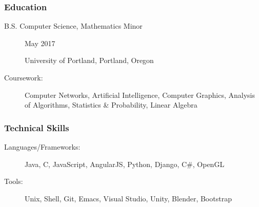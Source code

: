 \documentclass{article}
\begin{document}
\subsubsection*{Education}
    \begin{description}
        \item[B.S. Computer Science, Mathematics Minor]\hfill May 2017

        University of Portland, Portland, Oregon

        \vspace{0.5em}

        \item[Coursework:]
            Computer Networks, 
            Artificial Intelligence, 
            Computer Graphics, 
            Analysis of Algorithms,
            Statistics \& Probability,
            Linear Algebra
    \end{description}



\subsubsection*{Technical Skills}
    \begin{description}    
        \item[Languages/Frameworks:] 
            Java, 
            C, 
            JavaScript, 
            AngularJS,
            Python, 
            Django, 
            C\#, 
            OpenGL

            \vspace{0.5em}

        \item[Tools:] 
            Unix, 
            Shell, 
            Git, 
            Emacs, 
            Visual Studio, 
            Unity, 
            Blender, 
            Bootstrap

    \end{description}
\end{document}
